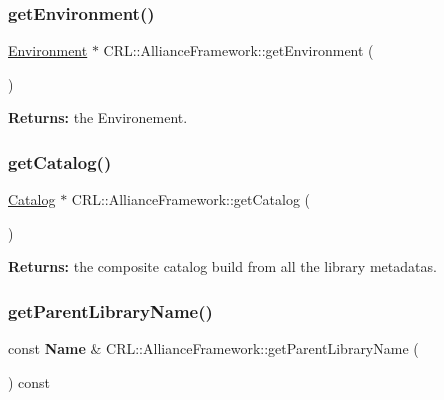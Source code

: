 \subsubsection{\texorpdfstring{get\+Environment()}{getEnvironment()}}
{\footnotesize\ttfamily \mbox{\hyperlink{classCRL_1_1Environment}{Environment}} $\ast$ C\+R\+L\+::\+Alliance\+Framework\+::get\+Environment (\begin{DoxyParamCaption}{ }\end{DoxyParamCaption})\hspace{0.3cm}{\ttfamily [inline]}}

{\bfseries Returns\+:} the Environement. \mbox{\label{classCRL_1_1AllianceFramework_a036bd6fa8f837c81f60b9d424f817add}} 
\subsubsection{\texorpdfstring{get\+Catalog()}{getCatalog()}}
{\footnotesize\ttfamily \mbox{\hyperlink{classCRL_1_1Catalog}{Catalog}} $\ast$ C\+R\+L\+::\+Alliance\+Framework\+::get\+Catalog (\begin{DoxyParamCaption}{ }\end{DoxyParamCaption})\hspace{0.3cm}{\ttfamily [inline]}}

{\bfseries Returns\+:} the composite catalog build from all the library metadatas. \mbox{\label{classCRL_1_1AllianceFramework_a4f1d2d34c254ac596e8c4a408ef6ba43}} 
\subsubsection{\texorpdfstring{get\+Parent\+Library\+Name()}{getParentLibraryName()}}
{\footnotesize\ttfamily const \textbf{ Name} \& C\+R\+L\+::\+Alliance\+Framework\+::get\+Parent\+Library\+Name (\begin{DoxyParamCaption}{ }\end{DoxyParamCaption}) const\hspace{0.3cm}{\ttfamily [inline]}}

